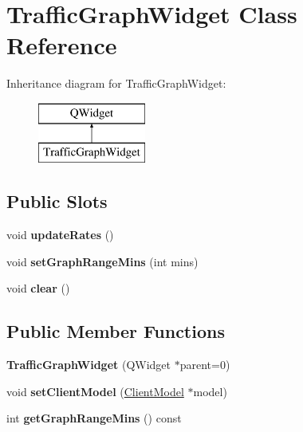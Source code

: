 \hypertarget{class_traffic_graph_widget}{}\section{Traffic\+Graph\+Widget Class Reference}
\label{class_traffic_graph_widget}
Inheritance diagram for Traffic\+Graph\+Widget\+:\begin{figure}[H]
\begin{center}
\leavevmode
\includegraphics[height=2.000000cm]{class_traffic_graph_widget}
\end{center}
\end{figure}
\subsection*{Public Slots}
\begin{DoxyCompactItemize}
\item 
\mbox{\label{class_traffic_graph_widget_a5a1ae0d0a8cc43c67386de4aa1111340}} 
void {\bfseries update\+Rates} ()
\item 
\mbox{\label{class_traffic_graph_widget_aa08cb5ae735e58a79bdff42b933ec4c4}} 
void {\bfseries set\+Graph\+Range\+Mins} (int mins)
\item 
\mbox{\label{class_traffic_graph_widget_a71c23db2649ab8781fa9a294e540b7ee}} 
void {\bfseries clear} ()
\end{DoxyCompactItemize}
\subsection*{Public Member Functions}
\begin{DoxyCompactItemize}
\item 
\mbox{\label{class_traffic_graph_widget_a99f4f3f14bab99bef8918cb4f5f69aa6}} 
{\bfseries Traffic\+Graph\+Widget} (Q\+Widget $\ast$parent=0)
\item 
\mbox{\label{class_traffic_graph_widget_a8f627aaf6171695d94a0e83b239fe1ac}} 
void {\bfseries set\+Client\+Model} (\mbox{\hyperlink{class_client_model}{Client\+Model}} $\ast$model)
\item 
\mbox{\label{class_traffic_graph_widget_a87cfbad14e4035755b5feb4ebff4c75c}} 
int {\bfseries get\+Graph\+Range\+Mins} () const
\end{DoxyCompactItemize}
